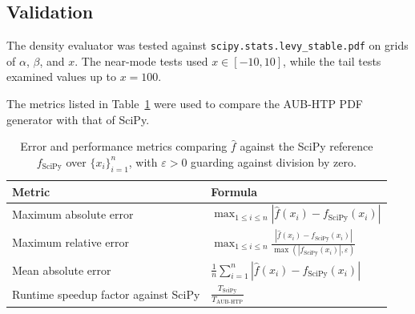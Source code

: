 \subsection{Validation}

The density evaluator was tested against \texttt{scipy.stats.levy\_stable.pdf} on grids of $\alpha$, $\beta$, and $x$. The near-mode tests used $x\in[-10,10]$, while the tail tests examined values up to $x = 100$.


The metrics listed in Table~\ref{tab:error-metrics} were used to compare the AUB-HTP PDF generator with that of SciPy.
\begin{table}[!htbp]
\centering
\renewcommand{\arraystretch}{2.2}
\begin{tabular}{@{}p{4cm} >{\centering\arraybackslash}m{7cm}@{}}
\toprule
\textbf{Metric} & \textbf{Formula} \\
\midrule
Maximum absolute error &
$ \max_{1 \leq i \leq n}\left|\hat{f}(x_i)-f_{\mathrm{SciPy}}(x_i)\right|$ \\
Maximum relative error &
$ \max_{1 \leq i \leq n}\frac{\left|\hat{f}(x_i)-f_{\mathrm{SciPy}}(x_i)\right|}{\max\left(\left|f_{\mathrm{SciPy}}(x_i)\right|,\varepsilon\right)}$ \\
Mean absolute error &
$ \frac{1}{n}\sum_{i=1}^{n}\left|\hat{f}(x_i)-f_{\mathrm{SciPy}}(x_i)\right|$ \\
Runtime speedup factor against SciPy &
$ \frac{T_{\mathrm{SciPy}}}{T_{\mathrm{AUB\text{-}HTP}}}$ \\
\bottomrule
\end{tabular}
\caption{Error and performance metrics comparing $\hat{f}$ against the SciPy reference $f_{\mathrm{SciPy}}$ over $\{x_i\}_{i=1}^{n}$, with $\varepsilon>0$ guarding against division by zero.}
\label{tab:error-metrics}
\end{table}

